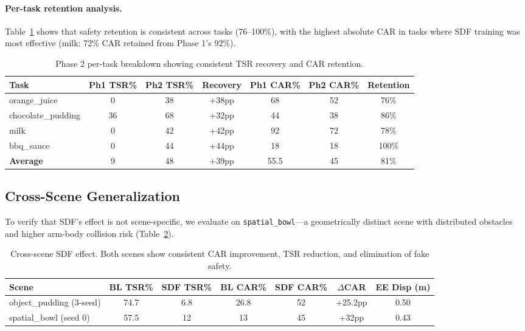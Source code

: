 \documentclass[letterpaper]{article}
\begin{document}
\paragraph{Per-task retention analysis.} Table~\ref{tab:phase2_tasks} shows that safety retention is consistent across tasks (76--100\%), with the highest absolute CAR in tasks where SDF training was most effective (milk: 72\% CAR retained from Phase 1's 92\%).

\begin{table}[h]
\centering
\caption{Phase 2 per-task breakdown showing consistent TSR recovery and CAR retention.}
\label{tab:phase2_tasks}
\begin{tabular}{lcccccc}
\toprule
\textbf{Task} & \textbf{Ph1 TSR\%} & \textbf{Ph2 TSR\%} & \textbf{Recovery} & \textbf{Ph1 CAR\%} & \textbf{Ph2 CAR\%} & \textbf{Retention} \\
\midrule
orange\_juice & 0 & 38 & +38pp & 68 & 52 & 76\% \\
chocolate\_pudding & 36 & 68 & +32pp & 44 & 38 & 86\% \\
milk & 0 & 42 & +42pp & 92 & 72 & 78\% \\
bbq\_sauce & 0 & 44 & +44pp & 18 & 18 & 100\% \\
\midrule
\textbf{Average} & 9 & 48 & +39pp & 55.5 & 45 & 81\% \\
\bottomrule
\end{tabular}
\end{table}

\subsection{Cross-Scene Generalization}
\label{sec:cross_scene}

To verify that SDF's effect is not scene-specific, we evaluate on \texttt{spatial\_bowl}---a geometrically distinct scene with distributed obstacles and higher arm-body collision risk (Table~\ref{tab:cross_scene}).

\begin{table}[h]
\centering
\caption{Cross-scene SDF effect. Both scenes show consistent CAR improvement, TSR reduction, and elimination of fake safety.}
\label{tab:cross_scene}
\begin{tabular}{lcccccc}
\toprule
\textbf{Scene} & \textbf{BL TSR\%} & \textbf{SDF TSR\%} & \textbf{BL CAR\%} & \textbf{SDF CAR\%} & \textbf{$\Delta$CAR} & \textbf{EE Disp (m)} \\
\midrule
object\_pudding (3-seed) & 74.7 & 6.8 & 26.8 & 52 & +25.2pp & 0.50 \\
spatial\_bowl (seed 0) & 57.5 & 12 & 13 & 45 & +32pp & 0.43 \\
\bottomrule
\end{tabular}
\end{table}
\end{document}
